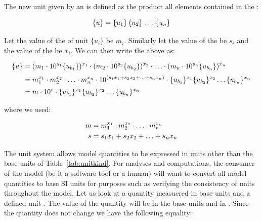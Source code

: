 The new unit \unew given by an \UnitDefinition is defined as the
product all \Unit elements contained in the \ListOfUnits: 
\begin{linenomath}
\begin{equation}
  \{u\} = \{u_1\} \, \{u_2\} \, \ldots \, \{u_n\} 
\label{eq:unitDefinition-semantics}
\end{equation}
\end{linenomath}
Let the value of the  of unit $\{u_i\}$ be
$m_i$. Similarly let the value of the  be $s_i$ and the value
of the  be $x_i$. We can then write the above as:
\begin{linenomath}
\begin{align}
  \{u\} &= (m_1 \cdot 10^{s_1} \{u_{b_1}\})^{x_1} \cdot
           (m_2 \cdot 10^{s_2} \{u_{b_2}\})^{x_2} \cdot \ldots \cdot (m_n \cdot
           10^{s_n} \{u_{b_n}\})^{x_n} \notag \\[2pt]
        &= m_1^{x_1} \cdot m_2^{x_2} \cdot \ldots \cdot m_n^{x_n}
           \cdot 10^{(s_1 x_1 + s_2 x_2 + \ldots + s_n x_n)}
           \cdot \{u_{b_1}\}^{x_1} \{u_{b_2}\}^{x_2} \ldots \{u_{b_n}\}^{x_n} \notag \\[2pt]
        &= m \cdot 10^{s} \cdot \{u_{b_1}\}^{x_1} \{u_{b_2}\}^{x_2} \ldots \{u_{b_n}\}^{x_n}
\label{eq:multip-units}
\end{align}
\end{linenomath}
where we used:
\begin{linenomath}
\begin{align}
  m &= m_1^{x_1} \cdot m_2^{x_2} \cdot \ldots \cdot m_n^{x_n} \notag\\
  s &= s_1 x_1 + s_2 x_2 + \ldots + s_n x_n \notag\\
\end{align}
\end{linenomath}

The unit system allows model quantities to be expressed in units
other than the base units of Table~\ref{tab:unitkind}.  For
analyses and computations, the consumer of the model (be it a
software tool or a human) will want to convert all model
quantities to base SI units for purposes such as verifying the
consistency of units throughout the model. Let us look at a
quantity measuered in base units and a defined unit \unew. The
value of the quantity will be \ybase in the base units and \ynew
in \unew. Since the quantity does not change we have the following
equality:

